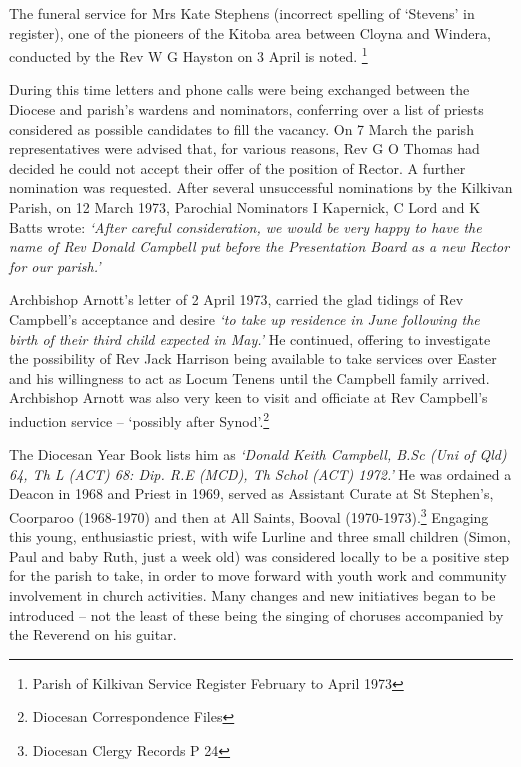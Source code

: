 The funeral service for Mrs Kate Stephens (incorrect spelling of `Stevens' in register), one of the pioneers of the Kitoba area between Cloyna and Windera, conducted by the Rev W G Hayston on 3 April is noted. \footnote{Parish of Kilkivan Service Register February to April 1973}


During this time letters and phone calls were being exchanged between the Diocese and parish's wardens and nominators, conferring over a list of priests considered as possible candidates to fill the vacancy. On 7 March the parish representatives were advised that, for various reasons, Rev G O Thomas had decided he could not accept their offer of the position of Rector. A further nomination was requested. After several unsuccessful nominations by the Kilkivan Parish, on 12 March 1973, Parochial Nominators I Kapernick, C Lord and K Batts wrote: \emph{`After careful consideration, we would be very happy to have the name of Rev Donald Campbell put before the Presentation Board as a new Rector for our parish.'}



Archbishop Arnott's letter of 2 April 1973, carried the glad tidings of Rev Campbell's acceptance and desire \emph{`to take up residence in June following the birth of their third child expected in May.'} He continued, offering to investigate the possibility of Rev Jack Harrison being available to take services over Easter and his willingness to act as Locum Tenens until the Campbell family arrived. Archbishop Arnott was also very keen to visit and officiate at Rev Campbell's induction service -- `possibly after Synod'.\footnote{Diocesan Correspondence Files}


The Diocesan Year Book lists him as \emph{`Donald Keith Campbell, B.Sc (Uni of Qld) 64, Th L (ACT) 68: Dip. R.E (MCD), Th Schol (ACT) 1972.'} He was ordained a Deacon in 1968 and Priest in 1969, served as Assistant Curate at St Stephen's, Coorparoo (1968-1970) and then at All Saints, Booval (1970-1973).\footnote{Diocesan Clergy Records P 24} Engaging this young, enthusiastic priest, with wife Lurline and three small children (Simon, Paul and baby Ruth, just a week old) was considered locally to be a positive step for the parish to take, in order to move forward with youth work and community involvement in church activities. Many changes and new initiatives began to be introduced -- not the least of these being the singing of choruses accompanied by the Reverend on his guitar.


